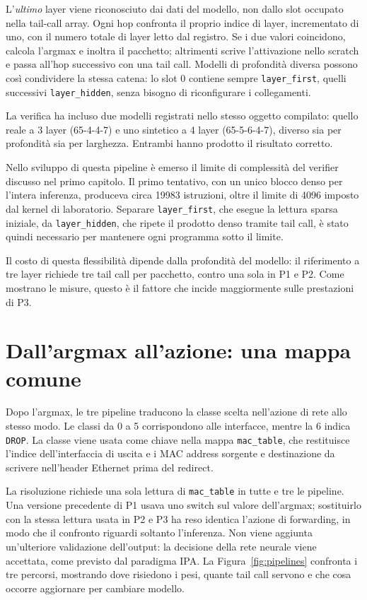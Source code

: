 \documentclass[binding=0.6cm,italian,oneside,noexaminfo]{sapthesis}
\begin{document}
L'\emph{ultimo} layer viene riconosciuto dai dati del modello, non dallo slot occupato nella tail-call array. Ogni hop confronta il proprio indice di layer, incrementato di uno, con il numero totale di layer letto dal registro. Se i due valori coincidono, calcola l'argmax e inoltra il pacchetto; altrimenti scrive l'attivazione nello scratch e passa all'hop successivo con una tail call. Modelli di profondità diversa possono così condividere la stessa catena: lo slot 0 contiene sempre \texttt{layer\_first}, quelli successivi \texttt{layer\_hidden}, senza bisogno di riconfigurare i collegamenti.

La verifica ha incluso due modelli registrati nello stesso oggetto compilato: quello reale a 3 layer (65-4-4-7) e uno sintetico a 4 layer (65-5-6-4-7), diverso sia per profondità sia per larghezza. Entrambi hanno prodotto il risultato corretto.

Nello sviluppo di questa pipeline è emerso il limite di complessità del verifier discusso nel primo capitolo. Il primo tentativo, con un unico blocco denso per l'intera inferenza, produceva circa 19983 istruzioni, oltre il limite di 4096 imposto dal kernel di laboratorio. Separare \texttt{layer\_first}, che esegue la lettura sparsa iniziale, da \texttt{layer\_hidden}, che ripete il prodotto denso tramite tail call, è stato quindi necessario per mantenere ogni programma sotto il limite.

Il costo di questa flessibilità dipende dalla profondità del modello: il riferimento a tre layer richiede tre tail call per pacchetto, contro una sola in P1 e P2. Come mostrano le misure, questo è il fattore che incide maggiormente sulle prestazioni di P3.

\section{Dall'argmax all'azione: una mappa comune}

Dopo l'argmax, le tre pipeline traducono la classe scelta nell'azione di rete allo stesso modo. Le classi da 0 a 5 corrispondono alle interfacce, mentre la 6 indica \texttt{DROP}. La classe viene usata come chiave nella mappa \texttt{mac\_table}, che restituisce l'indice dell'interfaccia di uscita e i MAC address sorgente e destinazione da scrivere nell'header Ethernet prima del redirect.

La risoluzione richiede una sola lettura di \texttt{mac\_table} in tutte e tre le pipeline. Una versione precedente di P1 usava uno switch sul valore dell'argmax; sostituirlo con la stessa lettura usata in P2 e P3 ha reso identica l'azione di forwarding, in modo che il confronto riguardi soltanto l'inferenza. Non viene aggiunta un'ulteriore validazione dell'output: la decisione della rete neurale viene accettata, come previsto dal paradigma IPA. La Figura~\ref{fig:pipelines} confronta i tre percorsi, mostrando dove risiedono i pesi, quante tail call servono e che cosa occorre aggiornare per cambiare modello.
\end{document}

